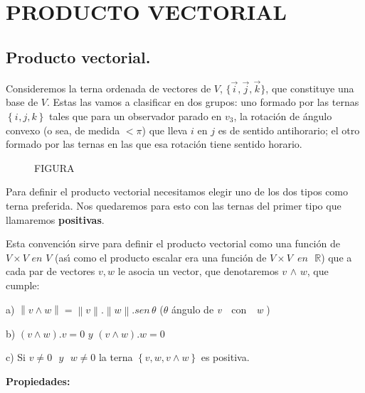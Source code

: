 \chapter{PRODUCTO VECTORIAL}

\section{ Producto vectorial.}
\label{producto.vectorial}

\bigskip
Consideremos la terna ordenada de vectores de $V$, $\{
\overrightarrow{i} ,\overrightarrow{j} ,\overrightarrow{k} \}$,
que constituye una base de $V$. Estas las vamos a clasificar en
dos grupos: uno formado por las ternas $\left\{ {i^{} ,j,k }
\right\}$ tales que para un observador parado en $v_3$, la
rotaci\'{o}n de \'{a}ngulo convexo (o sea, de medida $< \pi $) que
lleva $i$ en $j$ es de sentido antihorario; el otro formado por
las ternas en las que esa rotaci\'{o}n tiene sentido horario.


\begin{figure}[htb]
\centering
FIGURA
\end{figure}

\bigskip

Para definir el producto vectorial necesitamos elegir uno de los
dos tipos como terna preferida. Nos quedaremos para esto con las
ternas del primer tipo que llamaremos \textbf {positivas}.
\bigskip

Esta convenci\'{o}n sirve para definir el producto vectorial como
una funci\'{o}n de $V \times V\,\,en\,\,V$ (as\'{\i} como el
producto escalar era una funci\'{o}n de $V \times
V\,\,\,en\,\,\,\,\mathbb{R}$) que a cada par de vectores $v,w$ le
asocia un vector, que denotaremos $v$ $ \wedge $ $w$, que cumple:

\noindent a) $\left\| {v \wedge w} \right\| = \left\| {v}
\right\|.\left\| {w} \right\|.sen\,\theta $  ($\theta $ \'{a}ngulo
de \textit{v} \,\, con \,\, \textit{w} )

\noindent b) $\left( {v \wedge w} \right).v = 0\,\,y\,\,\left( {v
\wedge w} \right).w = 0$

\noindent c) Si $v \ne 0\,\,\,\,y\,\,\,\,w \ne 0$ la terna
$\left\{ {v,w,v \wedge w} \right\}$ es positiva.


\bigskip

\textbf{Propiedades:}

